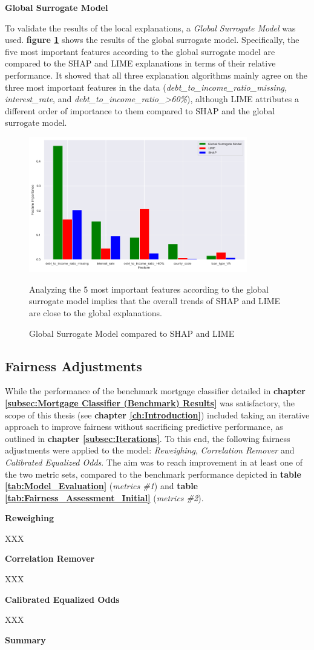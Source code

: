 \textbf{Global Surrogate Model}

To validate the results of the local explanations, a \textit{Global Surrogate Model} was used. \textbf{figure \ref{fig:Global_Surrogate}} shows the results of the global surrogate model. Specifically, the five most important features according to the global surrogate model are compared to the SHAP and LIME explanations in terms of their relative performance.
It showed that all three explanation algorithms mainly agree on the three most important features in the data (\textit{debt\_to\_income\_ratio\_missing, interest\_rate}, and \textit{debt\_to\_income\_ratio\_>60\%}), although LIME attributes a different order of importance to them compared to SHAP and the global surrogate model.

\begin{figure}[h]
    \centering
    \includegraphics[width=0.85\textwidth]{images/CHXX_UPDATE_Surrogate_SHAP_LIME_combined.png}
    \caption{Global Surrogate Model compared to SHAP and LIME}
    \medskip
    \small
    Analyzing the 5 most important features according to the global surrogate model implies that the overall trends of SHAP and LIME are close to the global explanations.
    \label{fig:Global_Surrogate}
\end{figure}

\subsection{Fairness Adjustments}\label{Fairness Adjustments Results}

While the performance of the benchmark mortgage classifier detailed in \textbf{chapter \ref{subsec:Mortgage Classifier (Benchmark) Results}} was satisfactory, the scope of this thesis (see \textbf{chapter \ref{ch:Introduction}}) included taking an iterative approach to improve fairness without sacrificing predictive performance, as outlined in \textbf{chapter \ref{subsec:Iterations}}.
To this end, the following fairness adjustments were applied to the model: \textit{Reweighing}, \textit{Correlation Remover} and \textit{Calibrated Equalized Odds}. The aim was to reach improvement in at least one of the two metric sets, compared to the benchmark performance depicted in \textbf{table \ref{tab:Model_Evaluation}} (\textit{metrics \#1}) and \textbf{table \ref{tab:Fairness_Assessment_Initial}} (\textit{metrics \#2}).

\textbf{Reweighing}

XXX

\textbf{Correlation Remover}

XXX

\textbf{Calibrated Equalized Odds}

XXX

\textbf{Summary}

